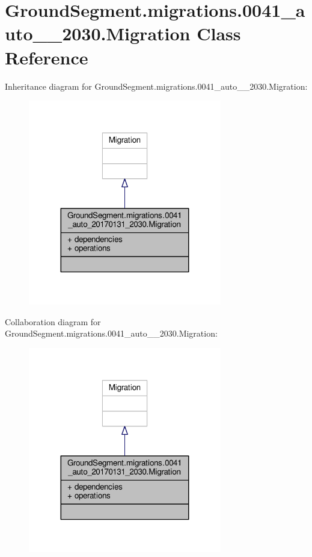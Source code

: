 \hypertarget{class_ground_segment_1_1migrations_1_10041__auto__20170131__2030_1_1_migration}{}\section{Ground\+Segment.\+migrations.0041\+\_\+auto\+\_\+\_\+2030.Migration Class Reference}
\label{class_ground_segment_1_1migrations_1_10041__auto__20170131__2030_1_1_migration}


Inheritance diagram for Ground\+Segment.\+migrations.0041\+\_\+auto\+\_\+\_\+2030.Migration\+:\nopagebreak
\begin{figure}[H]
\begin{center}
\leavevmode
\includegraphics[width=239pt]{class_ground_segment_1_1migrations_1_10041__auto__20170131__2030_1_1_migration__inherit__graph}
\end{center}
\end{figure}


Collaboration diagram for Ground\+Segment.\+migrations.0041\+\_\+auto\+\_\+\_\+2030.Migration\+:\nopagebreak
\begin{figure}[H]
\begin{center}
\leavevmode
\includegraphics[width=239pt]{class_ground_segment_1_1migrations_1_10041__auto__20170131__2030_1_1_migration__coll__graph}
\end{center}
\end{figure}
